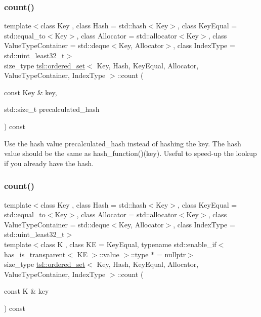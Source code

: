\subsubsection{\texorpdfstring{count()}{count()}\hspace{0.1cm}{\footnotesize\ttfamily [1/3]}}
{\footnotesize\ttfamily template$<$class Key , class Hash  = std\+::hash$<$\+Key$>$, class Key\+Equal  = std\+::equal\+\_\+to$<$\+Key$>$, class Allocator  = std\+::allocator$<$\+Key$>$, class Value\+Type\+Container  = std\+::deque$<$\+Key, Allocator$>$, class Index\+Type  = std\+::uint\+\_\+least32\+\_\+t$>$ \\
size\+\_\+type \mbox{\hyperlink{classtsl_1_1ordered__set}{tsl\+::ordered\+\_\+set}}$<$ Key, Hash, Key\+Equal, Allocator, Value\+Type\+Container, Index\+Type $>$\+::count (\begin{DoxyParamCaption}\item[{const Key \&}]{key,  }\item[{std\+::size\+\_\+t}]{precalculated\+\_\+hash }\end{DoxyParamCaption}) const\hspace{0.3cm}{\ttfamily [inline]}}

Use the hash value \textquotesingle{}precalculated\+\_\+hash\textquotesingle{} instead of hashing the key. The hash value should be the same as hash\+\_\+function()(key). Useful to speed-\/up the lookup if you already have the hash. \mbox{\label{classtsl_1_1ordered__set_a766cac50caed1afe6b1dbb2c6447a55b}} 
\subsubsection{\texorpdfstring{count()}{count()}\hspace{0.1cm}{\footnotesize\ttfamily [2/3]}}
{\footnotesize\ttfamily template$<$class Key , class Hash  = std\+::hash$<$\+Key$>$, class Key\+Equal  = std\+::equal\+\_\+to$<$\+Key$>$, class Allocator  = std\+::allocator$<$\+Key$>$, class Value\+Type\+Container  = std\+::deque$<$\+Key, Allocator$>$, class Index\+Type  = std\+::uint\+\_\+least32\+\_\+t$>$ \\
template$<$class K , class KE  = Key\+Equal, typename std\+::enable\+\_\+if$<$ has\+\_\+is\+\_\+transparent$<$ K\+E $>$\+::value $>$\+::type $\ast$  = nullptr$>$ \\
size\+\_\+type \mbox{\hyperlink{classtsl_1_1ordered__set}{tsl\+::ordered\+\_\+set}}$<$ Key, Hash, Key\+Equal, Allocator, Value\+Type\+Container, Index\+Type $>$\+::count (\begin{DoxyParamCaption}\item[{const K \&}]{key }\end{DoxyParamCaption}) const\hspace{0.3cm}{\ttfamily [inline]}}

